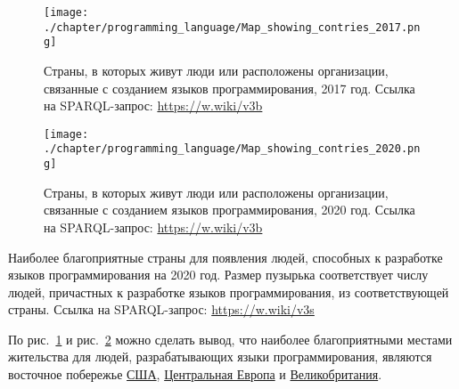 \begin{figure}[h]
\centering
	\texttt{[image: ./chapter/programming\_language/Map\_showing\_contries\_2017.png]}
	\caption[Страны, в которых живут люди или расположены организации, связанные с созданием языков программирования, 2017 год.]{Страны, в которых живут люди или расположены организации, связанные с созданием языков программирования, 2017 год. Ссылка на SPARQL-запрос: \href{https://w.wiki/v3b}{https://w.wiki/v3b}}
	\label{fig:countries_2017}
\end{figure}
\begin{figure}
\centering
	\texttt{[image: ./chapter/programming\_language/Map\_showing\_contries\_2020.png]}
	\caption[Страны, в которых живут люди или расположены организации, связанные с созданием языков программирования, 2020 год.]{Страны, в которых живут люди или расположены организации, связанные с созданием языков программирования, 2020 год. Ссылка на SPARQL-запрос: \href{https://w.wiki/v3b}{https://w.wiki/v3b}}
	\label{fig:countries_2020}
\end{figure}

\begin{marginfigure}
{
\setlength{\fboxsep}{0pt}%
\setlength{\fboxrule}{1pt}%
}
  \caption[Наиболее благоприятные страны для появления людей, способных к разработке языков программирования на 2020 год.]{Наиболее благоприятные страны для появления людей, способных к разработке языков программирования на 2020 год. Размер пузырька соответствует числу людей, причастных к разработке языков программирования, из соответствующей страны. Ссылка на SPARQL-запрос: \href{https://w.wiki/v3s}{https://w.wiki/v3s}}%
  \label{fig:countries_2_2020}%
\end{marginfigure}
По  рис.~\ref{fig:countries_2017} и рис.~\ref{fig:countries_2020} можно сделать вывод, что наиболее благоприятными местами жительства для людей, разрабатывающих языки программирования, являются восточное побережье \href{https://en.wikipedia.org/wiki/USA}{США}, \href{https://ru.wikipedia.org/wiki/Центральная_Европа}{Центральная Европа} и \href{https://ru.wikipedia.org/wiki/Великобритания}{Великобритания}.


